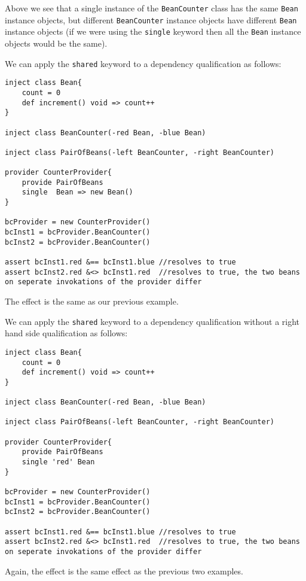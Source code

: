 \documentclass[conc-doc]{subfiles}
\begin{document}
Above we see that a single instance of the \lstinline{BeanCounter} class has the same \lstinline{Bean} instance objects, but different \lstinline{BeanCounter} instance objects have different \lstinline{Bean} instance objects (if we were using the \lstinline{single} keyword then all the \lstinline{Bean} instance objects would be the same).

We can apply the \lstinline{shared} keyword to a dependency qualification as follows:

\begin{lstlisting}
inject class Bean{
	count = 0
	def increment() void => count++ 
}

inject class BeanCounter(-red Bean, -blue Bean)

inject class PairOfBeans(-left BeanCounter, -right BeanCounter)

provider CounterProvider{
	provide PairOfBeans
	single  Bean => new Bean()
}

bcProvider = new CounterProvider()
bcInst1 = bcProvider.BeanCounter()
bcInst2 = bcProvider.BeanCounter()

assert bcInst1.red &== bcInst1.blue //resolves to true
assert bcInst2.red &<> bcInst1.red  //resolves to true, the two beans on seperate invokations of the provider differ
\end{lstlisting}

The effect is the same as our previous example.

We can apply the \lstinline{shared} keyword to a dependency qualification without a right hand side qualification as follows:

\begin{lstlisting}
inject class Bean{
	count = 0
	def increment() void => count++ 
}

inject class BeanCounter(-red Bean, -blue Bean)

inject class PairOfBeans(-left BeanCounter, -right BeanCounter)

provider CounterProvider{
	provide PairOfBeans
	single 'red' Bean
}

bcProvider = new CounterProvider()
bcInst1 = bcProvider.BeanCounter()
bcInst2 = bcProvider.BeanCounter()

assert bcInst1.red &== bcInst1.blue //resolves to true
assert bcInst2.red &<> bcInst1.red  //resolves to true, the two beans on seperate invokations of the provider differ
\end{lstlisting}

Again, the effect is the same effect as the previous two examples.
\end{document}
